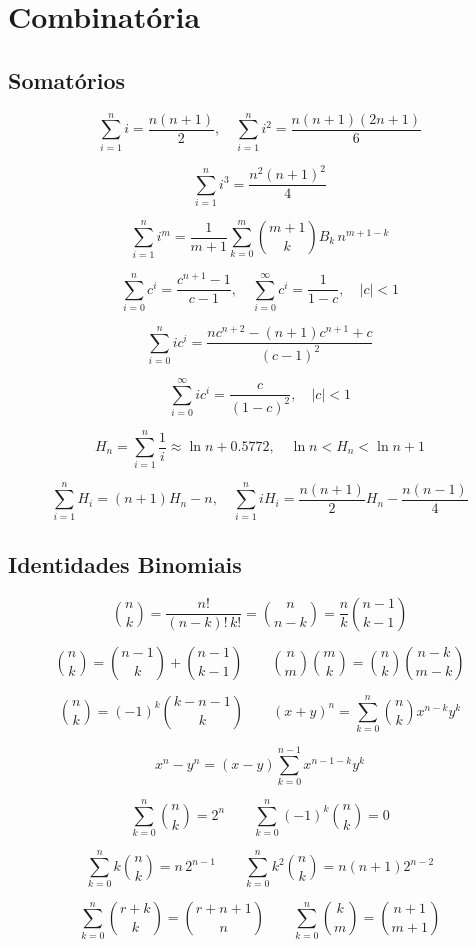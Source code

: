 \setlength{\parindent}{0pt}

\section{Combinatória}

\subsection{Somatórios}

\[\sum_{i=1}^n i = \frac{n(n+1)}{2}, \quad \sum_{i=1}^n i^2 = \frac{n(n+1)(2n+1)}{6}\]

\[\sum_{i=1}^n i^3 = \frac{n^2(n+1)^2}{4}\]

\[\sum_{i=1}^n i^m = \frac{1}{m+1}\sum_{k=0}^m \binom{m+1}{k} B_k\, n^{m+1-k}\]

\[\sum_{i=0}^n c^i = \frac{c^{n+1}-1}{c-1}, \quad \sum_{i=0}^\infty c^i = \frac{1}{1-c}, \quad |c|<1\]

\[\sum_{i=0}^n ic^i = \frac{nc^{n+2}-(n+1)c^{n+1}+c}{(c-1)^2}\]

\[\sum_{i=0}^\infty ic^i = \frac{c}{(1-c)^2}, \quad |c|<1\]

\[H_n = \sum_{i=1}^n \frac{1}{i} \approx \ln n + 0.5772, \quad \ln n < H_n < \ln n + 1\]

\[\sum_{i=1}^n H_i = (n+1)H_n - n, \quad \sum_{i=1}^n iH_i = \frac{n(n+1)}{2}H_n - \frac{n(n-1)}{4}\]

\subsection{Identidades Binomiais}

\[\binom{n}{k} = \frac{n!}{(n-k)!\,k!} = \binom{n}{n-k} = \frac{n}{k}\binom{n-1}{k-1}\]

\[\binom{n}{k} = \binom{n-1}{k}+\binom{n-1}{k-1} \qquad \binom{n}{m}\binom{m}{k} = \binom{n}{k}\binom{n-k}{m-k}\]

\[\binom{n}{k} = (-1)^k\binom{k-n-1}{k} \qquad (x+y)^n = \sum_{k=0}^n \binom{n}{k}x^{n-k}y^k\]

\[x^n - y^n = (x-y)\sum_{k=0}^{n-1}x^{n-1-k}y^k\]

\[\sum_{k=0}^n \binom{n}{k} = 2^n \qquad \sum_{k=0}^n (-1)^k\binom{n}{k} = 0\]

\[\sum_{k=0}^n k\binom{n}{k} = n\,2^{n-1} \qquad \sum_{k=0}^n k^2\binom{n}{k} = n(n+1)2^{n-2}\]

\[\sum_{k=0}^n \binom{r+k}{k} = \binom{r+n+1}{n} \qquad \sum_{k=0}^n \binom{k}{m} = \binom{n+1}{m+1}\]

